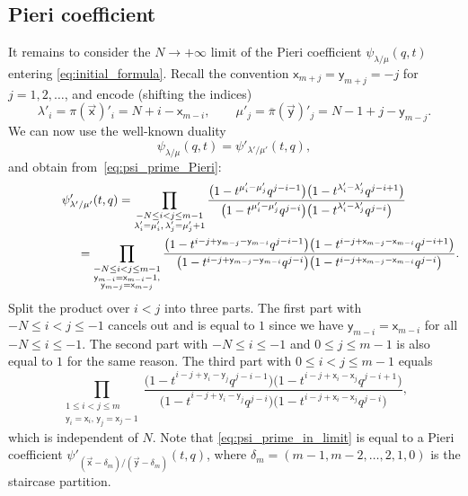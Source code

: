 \documentclass[pdftex]{sigma}
\numberwithin{equation}{section}
\begin{document}
\subsection{Pieri coefficient}

It remains to consider the $N\to+\infty$ limit of the Pieri
coefficient $\psi_{\lambda/\mu}(q,t)$
entering \eqref{eq:initial_formula}.
Recall the convention
$\mathsf{x}_{m+j}=\mathsf{y}_{m+j}
=-j$ for $j=1,2,\dots $,
and encode (shifting the indices)
\begin{equation*}
	\lambda'_i=\pi(\vec{\mathsf{x}})'_i=N+i-\mathsf{x}_{m-i},
	\qquad
	\mu'_j=\overline\pi(\vec{\mathsf{y}})'_j=N-1+j-\mathsf{y}_{m-j}.
\end{equation*}
We can now use
the well-known duality
\cite[proof of formula~(6.24)]{Macdonald1995}
\begin{equation*}
	\psi_{\lambda/\mu}(q,t)=
	\psi'_{\lambda'/\mu'}(t,q),
\end{equation*}
and obtain from~\eqref{eq:psi_prime_Pieri}:
\begin{gather*}
	\psi'_{\lambda'/\mu'}(t,q)
	=
	\prod_{\substack{-N\le i<j\le m-1
	\\
	\lambda'_{i}=\mu'_{i},\, \lambda'_{j}=\mu'_{j}+1}}
	\frac{\big(1-t^{\mu'_{i}-\mu'_{j}} q^{j-i-1}\big)\big(1-t^{\lambda'_{i}-\lambda'_{j}} q^{j-i+1}\big)}
	{\big(1-t^{\mu'_{i}-\mu'_{j}} q^{j-i}\big)\big(1-t^{\lambda'_{i}-\lambda'_{j}} q^{j-i}\big)}
	\\
\hphantom{\psi'_{\lambda'/\mu'}(t,q)=}{}
=
	\prod_{\substack{-N\le i<j\le m-1
	\\
	\mathsf{y}_{m-i}=\mathsf{x}_{m-i}-1,\\
	\mathsf{y}_{m-j}=\mathsf{x}_{m-j}}}
	\frac{\big(1-t^{i-j+\mathsf{y}_{m-j}-\mathsf{y}_{m-i}}
	q^{j-i-1}\big)
	\big(1-t^{i-j+\mathsf{x}_{m-j}-\mathsf{x}_{m-i}} q^{j-i+1}\big)}
	{\big(1-t^{i-j+\mathsf{y}_{m-j}-\mathsf{y}_{m-i}} q^{j-i}\big)
	\big(1-t^{i-j+\mathsf{x}_{m-j}-\mathsf{x}_{m-i}} q^{j-i}\big)}.
\end{gather*}
Split the product over $i<j$ into three parts.
The first part with $-N\le i<j\le -1$
cancels out and is equal to $1$
since
we have $\mathsf{y}_{m-i}=\mathsf{x}_{m-i}$ for all $-N\le i\le -1$.
The second part
with $-N\le i\le -1$ and $0\le j\le m-1$ is also equal to $1$ for the same reason.
The third part with $0\le i<j\le m-1$ equals
\begin{equation}
	\label{eq:psi_prime_in_limit}
	\prod_{\substack{1\le i<j\le m
	\\
	\mathsf{y}_{i}=\mathsf{x}_{i}
	,\,
	\mathsf{y}_{j}=\mathsf{x}_{j}-1}}
	\frac{\big(1-t^{i-j+\mathsf{y}_{i}-\mathsf{y}_{j}}
	q^{j-i-1}\big)
	\big(1-t^{i-j+\mathsf{x}_{i}-\mathsf{x}_{j}} q^{j-i+1}\big)}
	{\big(1-t^{i-j+\mathsf{y}_{i}-\mathsf{y}_{j}} q^{j-i}\big)
	\big(1-t^{i-j+\mathsf{x}_{i}-\mathsf{x}_{j}} q^{j-i}\big)},
\end{equation}
which is independent of $N$. Note that
\eqref{eq:psi_prime_in_limit} is equal to a Pieri coefficient
$\psi'_{(\vec{\mathsf{x}}-\delta_m)/(\vec{\mathsf{y}}-\delta_m)}(t,q)$,
where $\delta_m=(m-1,m-2,\dots,2,1,0)$ is the
staircase partition.
\end{document}
